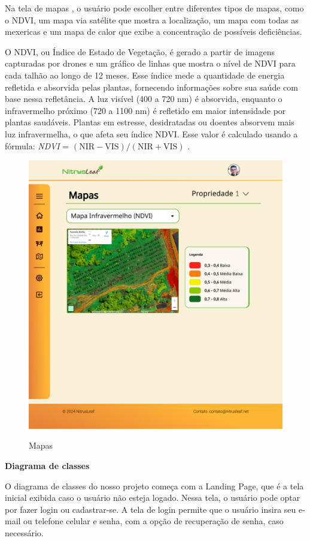 Na tela de mapas , o usuário pode escolher entre diferentes tipos de mapas, como o NDVI, um mapa via satélite que mostra a localização, um mapa com todas as mexericas e um mapa de calor que exibe a concentração de possíveis deficiências.

O NDVI, ou Índice de Estado de Vegetação, é gerado a partir de imagens capturadas por drones e um gráfico de linhas que mostra o nível de NDVI para cada talhão ao longo de 12 meses. Esse índice mede a quantidade de energia refletida e absorvida pelas plantas, fornecendo informações sobre sua saúde com base nessa refletância. A luz visível (400 a 720 nm) é absorvida, enquanto o infravermelho próximo (720 a 1100 nm) é refletido em maior intensidade por plantas saudáveis. Plantas em estresse, desidratadas ou doentes absorvem mais luz infravermelha, o que afeta seu índice NDVI. Esse valor é calculado usando a fórmula: \textit{NDVI} = \((\text{NIR} - \text{VIS}) / (\text{NIR} + \text{VIS})\) \cite{ResultadoNDVIArtigo, ResultadoNDVISite}.

\begin{figure}[H]
\centering
\caption{Mapas}
\includegraphics[width=0.7\linewidth]{Illustrations/tela-mapas.png}
\label{fig:tela-mapas}
\end{figure}

\textbf{Diagrama de classes}

O diagrama de classes do nosso projeto  começa com a Landing Page, que é a tela inicial exibida caso o usuário não esteja logado. Nessa tela, o usuário pode optar por fazer login ou cadastrar-se. A tela de login permite que o usuário insira seu e-mail ou telefone celular e senha, com a opção de recuperação de senha, caso necessário.

